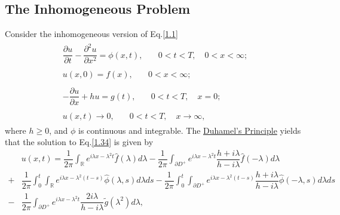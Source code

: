 \documentclass[12pt]{article}
\numberwithin{equation}{section}
\begin{document}
\subsection{The Inhomogeneous Problem}
\vspace{2mm}
Consider the inhomogeneous version of Eq.\eqref{1.1}
\begin{subequations}\label{1.34}
    \begin{align}
        \begin{split}\label{1.34a}
        \dfrac{\partial u}{\partial t}-\dfrac{\partial^2 u}{\partial x^2}=\phi(x,t),\quad &0<t<T,\quad 0<x<\infty ;
        \end{split}\\[1.5mm]
        \begin{split}\label{1.34b}
        u(x,0)=f(x),\quad &0<x<\infty;
        \end{split}\\
        \begin{split}\label{1.34c}
        -\dfrac{\partial u}{\partial x}+hu=g(t),\quad &0<t<T,\quad x=0;
        \end{split}\\
        \begin{split}\label{1.34d}
        u(x,t)\to 0,\quad &0<t<T,\quad x\to\infty,
        \end{split}
    \end{align}
\end{subequations}
where $h\geqslant 0$, and $\phi$ is continuous and integrable.
The \href{https://w.wiki/9bPB}{Duhamel's Principle} yields that the solution to Eq.\eqref{1.34} is given by
\begin{equation}\label{1.35}
    \begin{split}
        &u(x,t)=\dfrac{1}{2\pi}\int_{\mathbb{R}}e^{i\lambda x-\lambda^2 t}\hat{f}(\lambda)d\lambda-\dfrac{1}{2\pi} \int_{\partial D^+} e^{i\lambda x-\lambda^2 t}\dfrac{h+i\lambda}{h-i\lambda}\hat{f}(-\lambda)d\lambda\\
        +&\dfrac{1}{2\pi} \int_{0}^{t}\int_{\mathbb{R}} e^{i\lambda x-\lambda^2(t-s)}\hat{\phi}(\lambda,s)d\lambda ds-\dfrac{1}{2\pi} \int_{0}^{t}\int_{\partial D^+} e^{i\lambda x-\lambda^2(t-s)}\dfrac{h+i\lambda}{h-i\lambda}\hat{\phi}(-\lambda,s)d\lambda ds\\
        -&\dfrac{1}{2\pi} \int_{\partial D^+} e^{i\lambda x-\lambda^2 t}\dfrac{2i\lambda}{h-i\lambda}\tilde{g}(\lambda^2) d\lambda,
    \end{split}
\end{equation}
\end{document}
